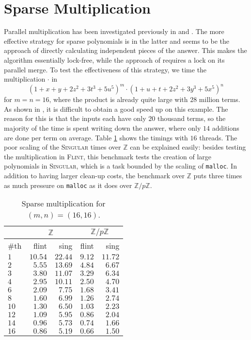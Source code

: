 \documentclass{deliverablereport}
\begin{document}
\section{Sparse Multiplication}
\label{section_sparse_mul}
Parallel multiplication has been investigated previously in \cite{Monagan:2009:PSP:1576702.1576739} and \cite{Gastineau:2013:HSM:2689622.2689630}. The more effective strategy for sparse polynomials is in the latter and seems to be the approach of directly calculating independent pieces of the answer. This makes the algorithm essentially lock-free, while the approach of \cite{Monagan:2009:PSP:1576702.1576739} requires a lock on its parallel merge. To test the effectiveness of this strategy, we time the multiplication $\cdot$ in
\begin{equation*}
(1+x+y+2z^2+3t^3+5u^5)^m \cdot (1+u+t+2z^2+3y^3+5x^5)^n
\end{equation*}
for $m=n=16$, where the product is already quite large with $28$ million terms. As shown in \cite{Monagan:2009:PSP:1576702.1576739}, it is difficult to obtain a good speed up on this example. The reason for this is that the inputs each have only $20$ thousand terms, so the majority of the time is spent writing down the answer, where only $14$ additions are done per term on average. Table \ref{table_sparse_mul1} shows the timings with $16$ threads. The poor scaling of the \textsc{Singular} times over $\mathbb{Z}$ can be explained easily: besides testing the multiplication in \textsc{Flint}, this benchmark tests the creation of large polynomials in \textsc{Singular}, which is a task bounded by the scaling of {\tt malloc}. In addition to having larger clean-up costs, the benchmark over $\mathbb{Z}$ puts three times as much pressure on {\tt malloc} as it does over $\mathbb{Z}/p\mathbb{Z}$.
\begin{table}[htb]
\begin{tabular}{l | r | r | r | r | }
 & \multicolumn{2}{|c|}{$\mathbb{Z}$} & \multicolumn{2}{|c|}{$\mathbb{Z}/p \mathbb{Z}$} \\ \hline
\#th   & flint & sing & flint & sing\\ \hline
$1$   & $10.54$ & $22.44$ &$9.12$ & $11.72$\\ \hline
$2$   & $5.55$  & $13.69$ &$4.84$ & $6.67$\\ \hline
$3$   & $3.80$  & $11.07$ &$3.29$ & $6.34$\\ \hline
$4$   & $2.95$  & $10.11$ &$2.50$ & $4.70$\\ \hline
$6$   & $2.09$  & $7.75$ &$1.68$  & $3.41$\\ \hline
$8$   & $1.60$  & $6.99$ &$1.26$  & $2.74$\\ \hline
$10$  & $1.30$  & $6.50$ &$1.03$  & $2.23$\\ \hline
$12$  & $1.09$  & $5.95$ &$0.86$  & $2.04$\\ \hline
$14$  & $0.96$  & $5.73$ &$0.74$  & $1.66$\\ \hline
$16$  & $0.86$  & $5.19$ &$0.66$  & $1.50$\\ \hline
\end{tabular}
\caption{Sparse multiplication for $(m, n) = (16, 16)$.}
\label{table_sparse_mul1}
\end{table}
\end{document}
